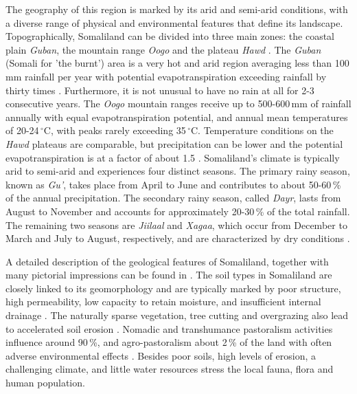 The geography of this region is marked by its arid and semi-arid conditions, with a diverse range of physical and environmental features that define its landscape. Topographically, Somaliland can be divided into three main zones: the coastal plain \textit{Guban}, the mountain range \textit{Oogo} and the plateau \textit{Hawd} \autocite{republicofsomaliaRepublicSomalilandCountry2021}. The \textit{Guban} (Somali for 'the burnt') area is a very hot and arid region averaging less than 100\,mm rainfall per year with potential evapotranspiration exceeding rainfall by thirty times \autocite{salemTerritorialDiagnosticReport2016}. Furthermore, it is not unusual to have no rain at all for 2-3 consecutive years. The \textit{Oogo} mountain ranges receive up to 500-600\,mm of rainfall annually with equal evapotranspiration potential, and annual mean temperatures of 20-24\,$^{\circ}$C, with peaks rarely exceeding 35\,$^{\circ}$C. Temperature conditions on the \textit{Hawd} plateaus are comparable, but precipitation can be lower and the potential evapotranspiration is at a factor of about 1.5 \autocite{abdulkadirAssessmentDroughtRecurrence2017,salemTerritorialDiagnosticReport2016}.\newline
Somaliland's climate is typically arid to semi-arid and experiences four distinct seasons. The primary rainy season, known as \textit{Gu'}, takes place from April to June and contributes to about 50-60\,\% of the annual precipitation. The secondary rainy season, called \textit{Dayr}, lasts from August to November and accounts for approximately 20-30\,\% of the total rainfall. The remaining two seasons are \textit{Jiilaal} and \textit{Xagaa}, which occur from December to March and July to August, respectively, and are characterized by dry conditions \autocite{abdulkadirAssessmentDroughtRecurrence2017,republicofsomaliaRepublicSomalilandCountry2021}.

A detailed description of the geological features of Somaliland, together with many pictorial impressions can be found in \autocite{petrucciLandscapeLandformsNorthern2022}. The soil types in Somaliland are closely linked to its geomorphology and are typically marked by poor structure, high permeability, low capacity to retain moisture, and insufficient internal drainage \autocite{salemTerritorialDiagnosticReport2016}. The naturally sparse vegetation, tree cutting and overgrazing also lead to accelerated soil erosion \autocite{salemTerritorialDiagnosticReport2016}. Nomadic and transhumance pastoralism activities influence around 90\,\%, and agro-pastoralism about 2\,\% of the land with often adverse environmental effects \autocite{salemTerritorialDiagnosticReport2016}. Besides poor soils, high levels of erosion, a challenging climate, and little water resources stress the local fauna, flora and human population. 

